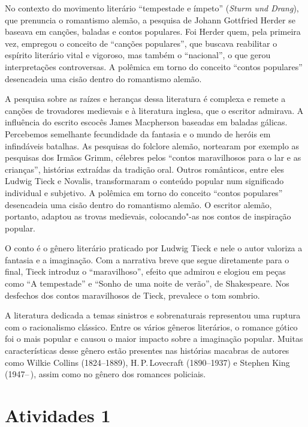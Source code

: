 \documentclass[12pt]{extarticle}
\begin{document}
No contexto do movimento literário ``tempestade e ímpeto'' (\textit{Sturm und Drang}), que prenuncia o romantismo alemão, a pesquisa de Johann Gottfried Herder se baseava em canções, baladas e contos populares. Foi Herder quem, 
pela primeira vez, empregou o conceito de ``canções populares'', que 
buscava reabilitar o espírito literário vital e vigoroso, mas também o ``nacional'', 
o que gerou interpretações controversas. A polêmica em torno do conceito ``contos populares'' 
desencadeia uma cisão dentro do romantismo alemão. 

A pesquisa sobre as raízes e heranças dessa literatura é complexa e remete a canções de trovadores medievais e à literatura inglesa, que o escritor admirava. 
A influência do escrito escocês James Macpherson baseadas em baladas gálicas.
Percebemos semelhante fecundidade da fantasia e o mundo de heróis em infindáveis batalhas.
As pesquisas do folclore alemão, nortearam  por exemplo as pesquisas dos Irmãos Grimm, célebres pelos ``contos maravilhosos para o lar e as crianças'', histórias extraídas da tradição oral. 
Outros românticos, entre eles Ludwig Tieck e Novalis, transformaram o conteúdo popular num significado individual e subjetivo. 
A polêmica em torno do conceito ``contos populares'' desencadeia uma cisão dentro do romantismo alemão. 
O escritor alemão, portanto, adaptou as trovas medievais, colocando"-as nos contos de inspiração popular.

O conto é o gênero literário praticado por Ludwig Tieck e nele o autor valoriza a fantasia e a imaginação.
Com a narrativa breve que segue diretamente para o final, Tieck introduz o ``maravilhoso'', efeito que 
admirou e elogiou em peças como ``A tempestade'' e ``Sonho de uma noite de verão'', de Shakespeare. 
Nos desfechos dos contos maravilhosos de Tieck, prevalece o tom sombrio.

A literatura dedicada a temas sinistros e sobrenaturais representou uma ruptura com o racionalismo clássico. 
Entre os vários gêneros literários, o romance gótico foi o mais popular e causou o maior impacto sobre a imaginação popular. Muitas características desse gênero estão presentes nas histórias macabras de autores como 
Wilkie Collins (1824--1889), H.\,P.\,Lovecraft (1890--1937) e Stephen King (1947--\,), 
assim como no gênero dos romances policiais. 


\section{Atividades 1}
\end{document}
